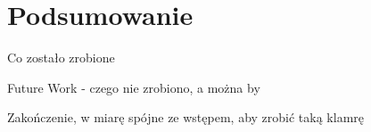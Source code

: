 \section*{Podsumowanie}

Co zostało zrobione

Future Work - czego nie zrobiono, a można by

Zakończenie, w miarę spójne ze wstępem, aby zrobić taką klamrę